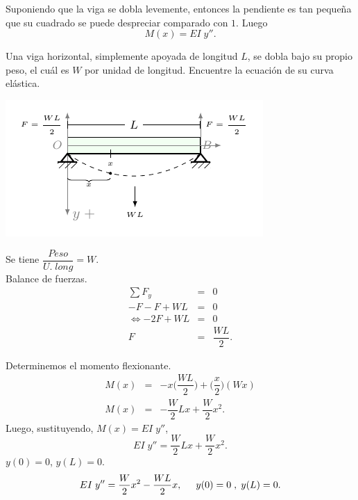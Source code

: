 \documentclass{beamer}
\begin{document}
\begin{frame}[t]
	\vspace{-2mm}
	\begin{block}{}
		Suponiendo que la viga se dobla levemente, entonces la pendiente es tan pequeña que su cuadrado se puede despreciar comparado con \(1\). Luego
		\[
			M(x) = EI \;y''.
		\]
	\end{block}
	\vspace{-3mm}
	\begin{example}
		Una viga horizontal, simplemente apoyada de longitud \(L\), se dobla bajo su propio peso, el cuál es \(W\) por unidad de longitud. Encuentre la ecuación de su curva elástica.\\
		\begin{minipage}{0.6\linewidth}
			\includegraphics[width= \linewidth]{IMAGENES_VIGAS/4/tikz.pdf}
		\end{minipage}
		\begin{minipage}{0.3\linewidth}
			\footnotesize 
			Se tiene \(\dfrac{Peso}{U.\;long} =W\).\\[2mm]
			Balance de fuerzas.
			\[
				\begin{array}{rcl}
					\sum F_y & = & 0 \\[1mm]
					-F-F+WL & = & 0 \\[1mm]
					\iff -2F + WL & = & 0 \\[1mm]
					F & = & \dfrac{WL}{2}.
				\end{array}
			\]
		\end{minipage}
	\end{example}
\end{frame}

\begin{frame}[t]
	\begin{exampleblock}{}
		Determinemos el momento flexionante.
		\[
			\begin{array}{rcl}
				M(x) & = & -x \bigg(\dfrac{WL}{2}\bigg) + \bigg(\dfrac{x}{2}\bigg) (Wx) \\[5mm]
				M(x) & = & - \dfrac{W}{2} Lx + \dfrac{W}{2} x^2.
			\end{array}
		\]
		Luego, sustituyendo, \(M(x) =EI\;y''\),
		\[
			EI\;y'' = \dfrac{W}{2} Lx + \dfrac{W}{2} x^2.
		\]
		\(y(0) =0\), \(y(L) =0\).
		\[
			EI \; y'' = \dfrac{W}{2} x^2- \dfrac{WL}{2} x, \hspace{5mm} y(0) =0 \;,\; y(L) =0.
		\]
	\end{exampleblock}
\end{frame}
\end{document}
